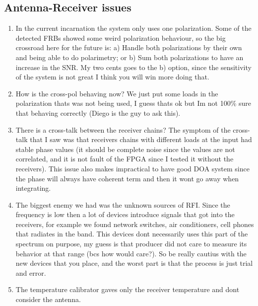 \subsection{Antenna-Receiver issues}
\begin{enumerate}
    \item In the current incarnation the system only uses one polarization. Some of the detected FRBs showed some weird polarization behaviour, so the big crossroad here for the future is: a) Handle both polarizations by their own and being able to do polarimetry; or b) Sum both polarizations to have an increase in the SNR.
        My two cents goes to the b) option, since the sensitivity of the system is not great I think you will win more doing that.
    \item How is the cross-pol behaving now? We just put some loads in the polarization thats was not being used, I guess thats ok but Im not 100\% sure that behaving correctly (Diego is the guy to ask this).

    \item There is a cross-talk between the receiver chains? The symptom of the cross-talk that I saw was that receivers chains with different loads at the input had stable phase values (it should be complete noise since the values are not correlated, and it is not fault of the FPGA since I tested it without the receivers). This issue also makes impractical to have good DOA system since the phase will always have coherent term and then it wont go away when integrating.

    \item The biggest enemy we had was the unknown sources of RFI. Since the frequency is low then a lot of devices introduce signals that got into the receivers, for example we found network switches, air conditioners, cell phones that radiates in the band. This devices dont necessarily uses this part of the spectrum on purpose, my guess is that producer did not care to measure its behavior at that range (bcs how would care?). So be really cautius with the new devices that you place, and the worst part is that the process is just trial and error.

    \item The temperature calibrator gaves only the receiver temperature and dont consider the antenna.

\end{enumerate}

